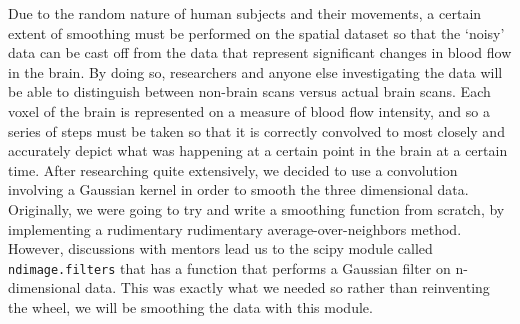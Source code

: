 \par \indent Due to the random nature of human subjects and their movements, a certain extent of smoothing must be performed on the spatial dataset so that the ‘noisy’ data can be cast off from the data that represent significant changes in blood flow in the brain. By doing so, researchers and anyone else investigating the data will be able to distinguish between non-brain scans versus actual brain scans. Each voxel of the brain is represented on a measure of blood flow intensity, and so a series of steps must be taken so that it is correctly convolved to most closely and accurately depict what was happening at a certain point in the brain at a certain time. After researching quite extensively, we decided to use a convolution involving a Gaussian kernel in order to smooth the three dimensional data. Originally, we were going to try and write a smoothing function from scratch, by implementing a rudimentary rudimentary average-over-neighbors method. However, discussions with mentors lead us to the scipy module called \texttt{ndimage.filters} that has a function that performs a Gaussian filter on n-dimensional data. This was exactly what we needed so rather than reinventing the wheel, we will be smoothing the data with this module.
